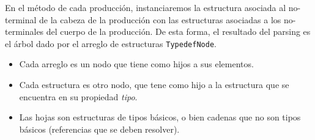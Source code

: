     En el método de cada producción, instanciaremos la estructura asociada al no-terminal de la cabeza de la producción con las estructuras asociadas a los no-terminales del cuerpo de la producción. De esta forma, el resultado del parsing es el árbol dado por el arreglo de estructuras \texttt{TypedefNode}. 

\begin{itemize}
    \item Cada arreglo es un nodo que tiene como hijos a sus elementos.
    \item Cada estructura es otro nodo, que tene como hijo a la estructura que
        se encuentra en su propiedad \textit{tipo}.
    \item Las hojas son estructuras de tipos básicos, o bien cadenas que no
        son tipos básicos (referencias que se deben resolver).
\end{itemize}

